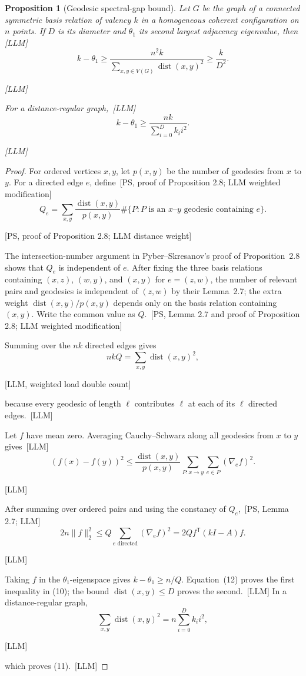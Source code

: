 \documentclass[10pt]{amsart}
\newtheorem{proposition}[theorem]{Proposition}
\theoremstyle{remark}
\DeclareMathOperator{\dist}{dist}
\newcommand{\prov}[1]{\unskip\, {\normalfont\scriptsize\color{provgray}\textsf{[#1]}}}
\newcommand{\eqprov}[1]{%
  \par\nobreak\vspace{-0.68\baselineskip}%
  \noindent\hfill{\normalfont\scriptsize\color{provgray}\textsf{[#1]}}%
  \par\vspace{0.20\baselineskip}%
}
\begin{document}
\begin{proposition}[Geodesic spectral-gap bound]\label{prop:poincare}
Let $G$ be the graph of a connected symmetric basis relation of valency $k$ in a homogeneous coherent configuration on $n$ points. If $D$ is its diameter and $\theta_1$ its second largest adjacency eigenvalue, then\prov{LLM}
\begin{equation}
k-\theta_1\ge \frac{n^2k}{\displaystyle\sum_{x,y\in V(G)}\dist(x,y)^2}\ge\frac{k}{D^2}.
\end{equation}
\eqprov{LLM}
For a distance-regular graph,\prov{LLM}
\begin{equation}
k-\theta_1\ge\frac{nk}{\displaystyle\sum_{i=0}^{D}k_i i^2}.
\end{equation}
\eqprov{LLM}
\end{proposition}

\begin{proof}
For ordered vertices $x,y$, let $p(x,y)$ be the number of geodesics from $x$ to $y$. For a directed edge $e$, define\prov{PS, proof of Proposition 2.8; LLM weighted modification}
\[
Q_e=\sum_{x,y}\frac{\dist(x,y)}{p(x,y)}\#\{P:P\text{ is an }x\text{--}y\text{ geodesic containing }e\}.
\]
\eqprov{PS, proof of Proposition 2.8; LLM distance weight}
The intersection-number argument in Pyber--Skresanov's proof of Proposition~2.8 shows that $Q_e$ is independent of $e$. After fixing the three basis relations containing $(x,z)$, $(w,y)$, and $(x,y)$ for $e=(z,w)$, the number of relevant pairs and geodesics is independent of $(z,w)$ by their Lemma~2.7; the extra weight $\dist(x,y)/p(x,y)$ depends only on the basis relation containing $(x,y)$. Write the common value as $Q$.\prov{PS, Lemma 2.7 and proof of Proposition 2.8; LLM weighted modification}

Summing over the $nk$ directed edges gives
\begin{equation}
nkQ=\sum_{x,y}\dist(x,y)^2,
\end{equation}
\eqprov{LLM, weighted load double count}
because every geodesic of length $\ell$ contributes $\ell$ at each of its $\ell$ directed edges.\prov{LLM}

Let $f$ have mean zero. Averaging Cauchy--Schwarz along all geodesics from $x$ to $y$ gives\prov{LLM}
\[
(f(x)-f(y))^2\le\frac{\dist(x,y)}{p(x,y)}\sum_{P:x\to y}\sum_{e\in P}(\nabla_e f)^2.
\]
\eqprov{LLM}
After summing over ordered pairs and using the constancy of $Q_e$,\prov{PS, Lemma 2.7; LLM}
\[
2n\lVert f\rVert_2^2\le Q\sum_{e\text{ directed}}(\nabla_e f)^2
=2Q f^{\mathsf T}(kI-A)f.
\]
\eqprov{LLM}
Taking $f$ in the $\theta_1$-eigenspace gives $k-\theta_1\ge n/Q$. Equation~(12) proves the first inequality in (10); the bound $\dist(x,y)\le D$ proves the second.\prov{LLM} In a distance-regular graph,
\[
\sum_{x,y}\dist(x,y)^2=n\sum_{i=0}^{D}k_i i^2,
\]
\eqprov{LLM}
which proves (11).\prov{LLM}
\end{proof}
\end{document}
